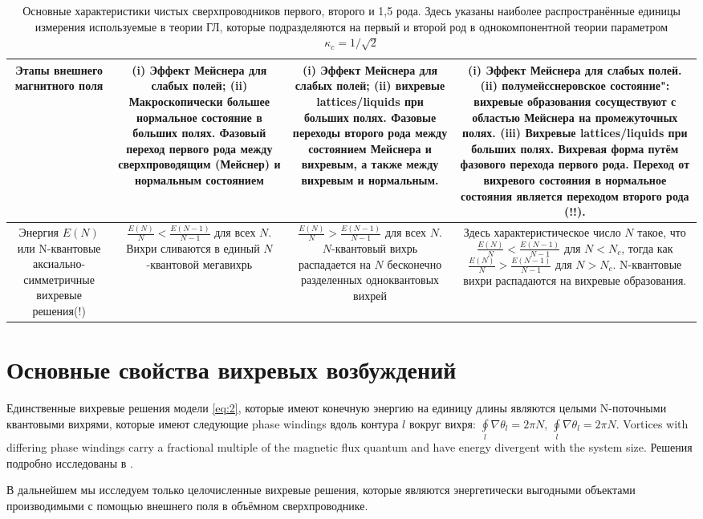 \begin{table}[ht]
\begin{tabular}{|C{.18}|C{.22}|C{.22}|C{.35}|}
        Этапы внешнего магнитного поля & (i) Эффект Мейснера для слабых полей; 
            (ii) Макроскопически большее нормальное состояние в больших полях. 
            Фазовый переход первого рода между сверхпроводящим (Мейснер) и 
            нормальным состоянием & (i) Эффект Мейснера для слабых полей; (ii) 
            вихревые lattices/liquids при больших полях. Фазовые переходы 
            второго рода между состоянием Мейснера и вихревым, а также 
            между вихревым и нормальным. & (i) Эффект Мейснера для слабых 
            полей. (ii) полумейсснеровское состояние": вихревые образования 
            сосуществуют с областью Мейснера на промежуточных полях. (iii) 
            Вихревые lattices/liquids при больших полях. Вихревая форма путём 
            фазового перехода первого рода. Переход от вихревого состояния в 
            нормальное состояния является переходом второго рода (!!).
        \\ \hline

        Энергия \( E(N) \) или N-квантовые аксиально-симметричные вихревые 
            решения(!) & \( \frac{E(N)}{N} < \frac{E(N-1)}{N-1} \) для всех 
            \( N \). Вихри сливаются в единый \( N \)-квантовой мегавихрь &
        \( \frac{E(N)}{N} > \frac{E(N-1)}{N-1} \) для всех \( N \). 
            \( N \)-квантовый вихрь распадается на \( N \) бесконечно 
            разделенных одноквантовых вихрей & Здесь характеристическое число 
            \( N \) такое, что \( \frac{E(N)}{N} < \frac{E(N-1)}{N-1} \) для 
            \( N < N_c \), тогда как 
            \( \frac{E(N)}{N} > \frac{E(N-1)}{N-1} \) для \( N > N_c \). 
            N-квантовые вихри распадаются на вихревые образования.
        \\ \hline

    \end{tabular}
    \caption{Основные характеристики чистых сверхпроводников первого, второго и 
        1,5 рода. Здесь указаны наиболее распространённые единицы измерения 
        используемые в теории ГЛ, которые подразделяются на первый и второй 
        род в однокомпонентной теории параметром \( \kappa_c = 1/\sqrt{2} \)}
\end{table}

\section{Основные свойства вихревых возбуждений}
\label{sec:2-2}

Единственные вихревые решения модели \eqref{eq:2}, которые имеют конечную 
энергию на единицу длины являются целыми N-поточными квантовыми вихрями, 
которые имеют следующие phase windings вдоль контура \( l \) вокруг вихря: 
\( \oint\limits_l \nabla\theta_l = 2\pi N \), 
\( \oint\limits_l \nabla\theta_l = 2\pi N \). Vortices with differing phase 
windings carry a fractional multiple of the magnetic flux quantum and have 
energy divergent with the system size. Решения подробно исследованы в
\cite{bib:22}.

В дальнейшем мы исследуем только целочисленные вихревые решения, которые 
являются энергетически выгодными объектами производимыми с помощью внешнего 
поля в объёмном сверхпроводнике.
